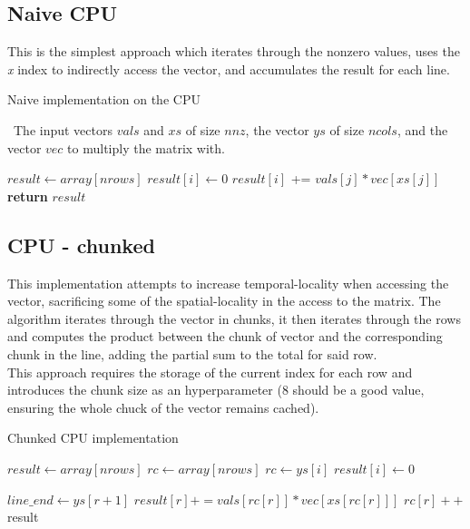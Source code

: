 \documentclass[conference]{IEEEtran}
\begin{document}
\subsection{Naive CPU}
This is the simplest approach which iterates through the nonzero values, uses the \textit{x} index to indirectly access the vector, and accumulates the result for each line.
\begin{algorithm}[ht!]
    \caption{Naive implementation on the CPU}
    \algorithmicrequire~The input vectors $vals$ and $xs$ of size $nnz$, the vector $ys$ of size $ncols$, and the vector $vec$ to multiply the matrix with.
    \begin{algorithmic}[1]
        \State $result \gets array[nrows]$
        \For{$i$ in $[0 \dots nrows)$} %
        \State $result[i] \gets 0$
        \For{$j$ in $[ys[i]\dots ys[i+1])$} %
            \State $result[i]$ += $vals[j] * vec[xs[j]]$
            \EndFor
        \EndFor
        \State \textbf{return} $result$ %
        \EndProcedure
    \end{algorithmic}
    \label{algo:CPU}
\end{algorithm}

\subsection{CPU - chunked}
This implementation attempts to increase temporal-locality when accessing the vector, sacrificing some of the spatial-locality in the access to the matrix. The algorithm iterates through the vector in chunks, it then iterates through the rows and computes the product between the chunk of vector and the corresponding chunk in the line, adding the partial sum to the total for said row.\\
This approach requires the storage of the current index for each row and introduces the chunk size as an hyperparameter ($8$ should be a good value, ensuring the whole chuck of the vector remains cached).
\begin{algorithm}[ht!]
    \caption{Chunked CPU implementation}
    \begin{algorithmic}[1]
        \State $result \gets array[nrows]$
        \State $rc \gets array[nrows]$
        \For{$i$ in $[0\dots nrows)$}
        \State $rc \gets ys[i]$ 
        \EndFor
        \For{$i$ in $[0\dots nrows)$}
        \State $result[i]\gets 0$
        \EndFor

        \For {$r$ in $[0\dots nrows)$}
        \State $line\_end \gets ys[r+1]$
        \State $result[r] += vals[rc[r]] * vec[xs[rc[r]]]$
        \State $rc[r]++$
        \EndWhile
        \EndFor
        \EndFor
        \State\Return result
        \EndProcedure
    \end{algorithmic}
    \label{algo:chunks}
\end{algorithm}
\end{document}
